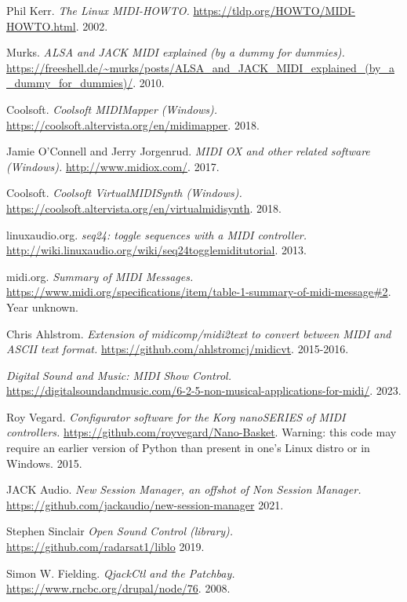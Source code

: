 {\begin{thebibliography}{99}
   Phil Kerr.
   \emph{The Linux MIDI-HOWTO.}
   \url{https://tldp.org/HOWTO/MIDI-HOWTO.html}.
   2002.

   Murks.
   \emph{ALSA and JACK MIDI explained (by a dummy for dummies).}
   \url{https://freeshell.de/~murks/posts/ALSA_and_JACK_MIDI_explained_(by_a_dummy_for_dummies)/}.
   2010.

   Coolsoft.
   \emph{Coolsoft MIDIMapper (Windows).}
   \url{https://coolsoft.altervista.org/en/midimapper}.
   2018.

   Jamie O'Connell and Jerry Jorgenrud.
   \emph{MIDI OX and other related software (Windows).}
   \url{http://www.midiox.com/}.
   2017.

   Coolsoft.
   \emph{Coolsoft VirtualMIDISynth (Windows).}
   \url{https://coolsoft.altervista.org/en/virtualmidisynth}.
   2018.

   linuxaudio.org.
   \emph{seq24: toggle sequences with a MIDI controller.}
   \url{http://wiki.linuxaudio.org/wiki/seq24togglemiditutorial}.
   2013.

   midi.org.
   \emph{Summary of MIDI Messages.}
   \url{https://www.midi.org/specifications/item/table-1-summary-of-midi-message#2}.
   Year unknown.

   Chris Ahlstrom.
   \emph{Extension of midicomp/midi2text to convert between MIDI and ASCII
      text format.}
   \url{https://github.com/ahlstromcj/midicvt}.
   2015-2016.

   \emph{Digital Sound and Music: MIDI Show Control.}
   \url{https://digitalsoundandmusic.com/6-2-5-non-musical-applications-for-midi/}.
   2023.

   Roy Vegard.
   \emph{Configurator software for the Korg nanoSERIES of MIDI controllers.}
   \url{https://github.com/royvegard/Nano-Basket}.
   Warning: this code may require an earlier version of Python than present in
   one's Linux distro or in Windows.
   2015.

   JACK Audio.
   \emph{New Session Manager, an offshot of Non Session Manager.}
   \url{https://github.com/jackaudio/new-session-manager}
   2021.

   Stephen Sinclair
   \emph{Open Sound Control (library).}
   \url{https://github.com/radarsat1/liblo}
   2019.

   Simon W. Fielding.
   \emph{QjackCtl and the Patchbay.}
   \url{https://www.rncbc.org/drupal/node/76}.
   2008.


\end{thebibliography}}

